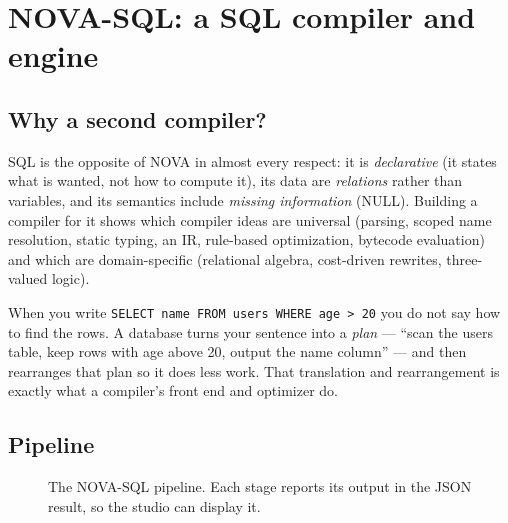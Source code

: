 \chapter{NOVA-SQL: a SQL compiler and engine}
\label{ch:sql}

\section{Why a second compiler?}
SQL is the opposite of NOVA in almost every respect: it is \emph{declarative} (it states what is wanted, not how to compute it), its data are \emph{relations} rather than variables, and its semantics include \emph{missing information} (NULL). Building a compiler for it shows which compiler ideas are universal (parsing, scoped name resolution, static typing, an IR, rule-based optimization, bytecode evaluation) and which are domain-specific (relational algebra, cost-driven rewrites, three-valued logic).

\begin{plain}
When you write \verb|SELECT name FROM users WHERE age > 20| you do not say how to find the rows. A database turns your sentence into a \emph{plan} --- ``scan the users table, keep rows with age above 20, output the name column'' --- and then rearranges that plan so it does less work. That translation and rearrangement is exactly what a compiler's front end and optimizer do.
\end{plain}

\section{Pipeline}
\begin{figure}[H]\centering
{}
\caption{The NOVA-SQL pipeline. Each stage reports its output in the JSON result, so the studio can display it.}
\end{figure}

